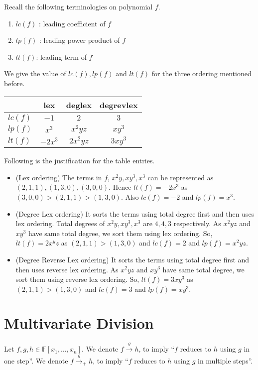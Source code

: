 Recall the following terminologies on polynomial $f$.
\begin{enumerate}
	\item $lc(f)$ : leading coefficient of $f$
	\item $lp(f)$ : leading power product of $f$
	\item $lt(f)$: leading term of $f$
\end{enumerate}
We give the value of $lc(f), lp(f)$ and $lt(f)$ for the three ordering
mentioned before.
\begin{center}
	\begin{tabular}{|l|c|c|c|}
		\hline 
		  & lex & deglex & degrevlex  \\ 
		\hline \hline
		$lc(f)$ & $-1$ & $2$ & $3$ \\ 
		\hline 
		$lp(f)$ & $x^3$ & $x^2yz$ & $xy^3$ \\ 
		\hline 
			$lt(f)$ & $-2x^3$ & $2x^2yz$ & $3xy^3$ \\ 
			\hline
		\end{tabular}
\end{center}
Following is the justification for the table entries.
\begin{itemize}
	\item (Lex ordering) The terms in $f$, $x^2y, xy^3, x^3$ can be
		represented as $(2,1,1), (1,3,0), (3,0,0)$. Hence
		$lt(f) = -2x^3$ as $(3,0,0)>(2,1,1)>(1,3,0)$. Also
		$lc(f) = -2$ and $lp(f) = x^3$.
	\item (Degree Lex ordering)
	It sorts the terms using total degree first and then uses lex
	ordering.  Total degrees of $x^2y, xy^3, x^3$ are $4, 4, 3$
	respectively.  As $x^2yz$ and $xy^3$ have same total degree,
	we sort them using lex ordering.  So, $lt(f) = 2x^yz$ as
	$(2,1,1)>(1,3,0)$ and $lc(f) = 2$ and $lp(f) = x^2yz$.  
	\item (Degree Reverse Lex ordering) It sorts the terms using
	total degree first and then uses reverse lex ordering.
	As $x^2yz$ and $xy^3$ have same total degree, we sort
	them using reverse lex ordering.  So, $lt(f) = 3xy^3$
	as $(2,1,1)>(1,3,0)$ and $lc(f) = 3$ and $lp(f) =
	xy^3$.
\end{itemize}

\section{Multivariate Division}
Let $f,g,h \in  \mathbb{F}[x_1, \ldots ,x_n]$. We denote $f \stackrel{g}{\longrightarrow} h$, to imply ``$f$ reduces to $h$ using $g$ in
one step''.  We denote $f \stackrel{g}{\longrightarrow}_{+} h$, to imply ``$f$
reduces to $h$ using $g$ in multiple steps''.
 
